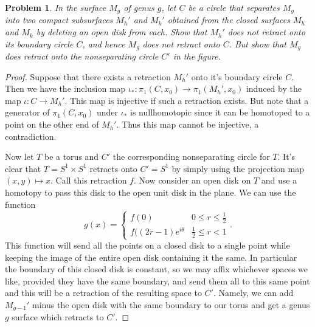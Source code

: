 \documentclass{article}
\newtheorem{problem}{Problem}
\begin{document}
\begin{problem}
In the surface $M_g$ of genus $g$, let $C$ be a circle that separates $M_g$ into two compact subsurfaces $M_h'$ and $M_k'$ obtained from the closed surfaces $M_h$ and $M_k$ by deleting an open disk from each. Show that $M_h'$ does not retract onto its boundary circle $C$, and hence $M_g$ does not retract onto $C$. But show that $M_g$ does retract onto the nonseparating circle $C'$ in the figure.
\end{problem}
\begin{proof}
Suppose that there exists a retraction $M_h'$ onto it's boundary circle $C$. Then we have the inclusion map $\iota_* : \pi_1(C,x_0) \to \pi_1(M_h',x_0)$ induced by the map $\iota : C \to M_h'$. This map is injective if such a retraction exists. But note that a generator of $\pi_1(C,x_0)$ under $\iota_*$ is nullhomotopic since it can be homotoped to a point on the other end of $M_h'$. Thus this map cannot be injective, a contradiction.
\vspace{100pt}

Now let $T$ be a torus and $C'$ the corresponding nonseparating circle for $T$. It's clear that $T = S^1 \times S^1$ retracts onto $C' = S^1$ by simply using the projection map $(x,y) \mapsto x$. Call this retraction $f$. Now consider an open disk on $T$ and use a homotopy to pass this disk to the open unit disk in the plane. We can use the function
\[
g(x) =
\begin{cases}
f(0) & 0 \leq r \leq \frac{1}{2}\\
f((2r-1)e^{i \theta} & \frac{1}{2} \leq r < 1
\end{cases}.
\]
\vspace{100pt}
This function will send all the points on a closed disk to a single point while keeping the image of the entire open disk containing it the same. In particular the boundary of this closed disk is constant, so we may affix whichever spaces we like, provided they have the same boundary, and send them all to this same point and this will be a retraction of the resulting space to $C'$.
\vspace{100pt}
Namely, we can add $M_{g-1}'$ minus the open disk with the same boundary to our torus and get a genus $g$ surface which retracts to $C'$.
\end{proof}
\end{document}
